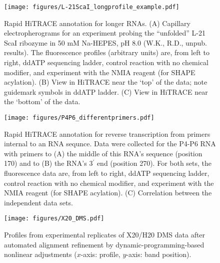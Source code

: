 \documentclass[letter]{bioinfo}
\begin{document}

%
%



\newpage

\begin{figure}
\centering
    \texttt{[image: figures/L-21ScaI\_longprofile\_example.pdf]}
\caption{Rapid  HiTRACE annotation for longer RNAs. (A) Capillary electropherograms for an experiment probing the ``unfolded'' L-21 ScaI ribozyme in 50 mM Na-HEPES, pH 8.0 (W.K., R.D., unpub. results). The fluorescence profiles (arbitrary units) are, from left to right, ddATP sequencing ladder, control reaction with no chemical modifier, and experiment with the NMIA reagent (for SHAPE acylation). (B) View in HiTRACE near the `top' of the data; note guidemark symbols in ddATP ladder. (C) View in HiTRACE near the `bottom' of the data.}
\label{f:L21-400nt}
\end{figure}

\begin{figure}
\centering
    \texttt{[image: figures/P4P6\_differentprimers.pdf]}
\caption{Rapid HiTRACE annotation for reverse transcription from primers internal to an RNA sequnce. Data were collected for the P4-P6 RNA with primers to (A) the middle of this RNA's sequence (position 170) and to (B) the RNA's 3$^\prime$ end (position 270). For both sets, the fluorescence data are, from left to right, ddATP sequencing ladder, control reaction with no chemical modifier, and experiment with the NMIA reagent (for SHAPE acylation). (C) Correlation between the independent data sets.}
\label{f:P4P6-internal-prim}
\end{figure}
\newpage

\begin{figure*}
\centering
    \texttt{[image: figures/X20\_DMS.pdf]}
\caption{Profiles from experimental replicates of X20/H20 DMS data after automated alignment refinement by dynamic-programming-based nonlinear adjustments ($x$-axis: profile, $y$-axis: band position).}
\label{f:x20-dms}
\end{figure*}
\end{document}
